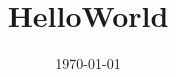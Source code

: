 \documentclass{jsarticle}
\title{HelloWorld}
\author{}
\date{\today}
\begin{document}
\maketitle
\section{}

\begin{equation}
\end{equation}

\begin{figure}
 \centering
 \caption{}
 \label{fig:model}
\end{figure}
\end{document}
